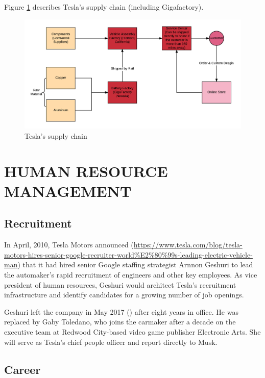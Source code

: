 \documentclass[12pt]{article}
\begin{document}
Figure \ref{supplypic} describes Tesla's supply chain (including Gigafactory).

\begin{figure}
	\includegraphics[width=\textwidth]{SupplyChain.png}
	\caption{Tesla's supply chain\label{supplypic}}
\end{figure}

\section{HUMAN RESOURCE MANAGEMENT}

\subsection{Recruitment}


In April, 2010, Tesla Motors announced (\url{https://www.tesla.com/blog/tesla-motors-hires-senior-google-recruiter-world%E2%80%99s-leading-electric-vehicle-man}) that it had hired senior Google staffing strategist Arnnon Geshuri to lead the automaker’s rapid recruitment of engineers and other key employees. As vice president of human resources, Geshuri would architect Tesla’s recruitment infrastructure and identify candidates for a growing number of job openings.

Geshuri left the company in May 2017 (\cite{ha17}) after eight years in office. He was replaced by Gaby Toledano, who joins the carmaker after a decade on the executive team at Redwood City-based video game publisher Electronic Arts. She will serve as Tesla’s chief people officer and report directly to Musk.

\subsection{Career}
\end{document}
